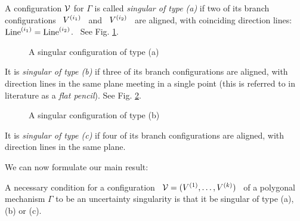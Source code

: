 \begin{defn}
%
A configuration $\mathcal{V}$ for $\Gamma$ is called \emph{singular of type
  (a)} if two of its branch configurations \
$V\sp{({i_{1}})}$ \ and \ $V\sp{({i_{2}})}$ \ are aligned, with coinciding
direction lines: \ $\operatorname{Line}\sp{({i_{1}})}=\operatorname{Line}\sp{({i_{2}})}$. \ See Fig.
\ref{fig:sing1}.

\begin{figure}[ht]
\centering \epsfysize=5.5cm  
\caption{A singular configuration of type (a)} \label{fig:sing1}
\end{figure}

It is \emph{singular of type (b)} if three of its branch
configurations are aligned, with direction lines in the same
plane meeting in a single point (this is referred to in literature as
a \emph{flat pencil}). See Fig. \ref{fig:sing2}.

\begin{figure}[ht]
\centering \epsfysize=6cm  
\caption{A singular configuration of type (b)} \label{fig:sing2}
\end{figure}

It is \emph{singular of type (c)} if four of its branch configurations
are aligned, with direction lines in the same plane.
%
\end{defn}

We can now formulate our main result:

\begin{thm}\label{thmain}
%
A necessary condition for a configuration \ $\mathcal{V}=(V\sp{({1})},\dotsc,V\sp{({k})})$ \
of a polygonal mechanism $\Gamma$ to be an uncertainty singularity is that it
be singular of type (a), (b) or (c).
%
\end{thm}

